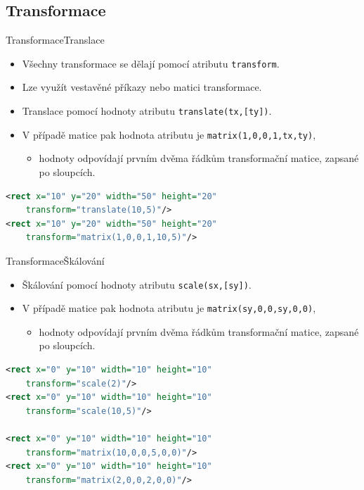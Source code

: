 \subsection{Transformace}
\begin{frame}[t,fragile]{Transformace}{Translace}
    \begin{itemize}
        \item Všechny transformace se dělají pomocí atributu \texttt{transform}.
        \item Lze využít vestavěné příkazy nebo matici transformace.
        \item Translace pomocí hodnoty atributu \texttt{translate(tx,[ty])}.
        \item V případě matice pak hodnota atributu je \texttt{matrix(1,0,0,1,tx,ty)},
        \begin{itemize}
            \item hodnoty odpovídají prvním dvěma řádkům transformační matice, zapsané po sloupcích. 
        \end{itemize}
    \end{itemize}
    
    \begin{lstlisting}[language=XML]
<rect x="10" y="20" width="50" height="20" 
    transform="translate(10,5)"/>
<rect x="10" y="20" width="50" height="20" 
    transform="matrix(1,0,0,1,10,5)"/>
    \end{lstlisting}
\end{frame}




\begin{frame}[t,fragile]{Transformace}{Škálování}
    \begin{itemize}
        \item Škálování pomocí hodnoty atributu \texttt{scale(sx,[sy])}.
        \item V případě matice pak hodnota atributu je \texttt{matrix(sy,0,0,sy,0,0)},
        \begin{itemize}
            \item hodnoty odpovídají prvním dvěma řádkům transformační matice, zapsané po sloupcích. 
        \end{itemize}
    \end{itemize}
    
    \begin{lstlisting}[language=XML]
<rect x="0" y="10" width="10" height="10" 
    transform="scale(2)"/>
<rect x="0" y="10" width="10" height="10" 
    transform="scale(10,5)"/>

<rect x="0" y="10" width="10" height="10" 
    transform="matrix(10,0,0,5,0,0)"/>
<rect x="0" y="10" width="10" height="10" 
    transform="matrix(2,0,0,2,0,0)"/>
    \end{lstlisting}
\end{frame}

